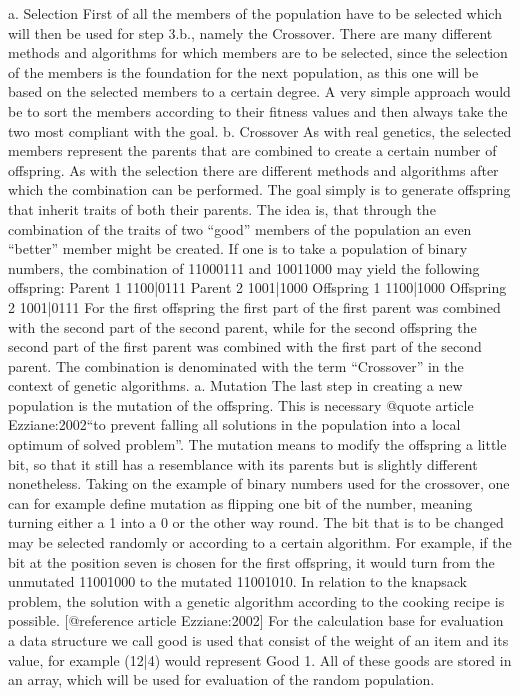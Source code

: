 \documentclass[11pt,a4paper]{article}
\begin{document}
a.    Selection
First of all the members of the population have to be selected which will then be used for step 3.b., namely the Crossover. There are many different methods and algorithms for which members are to be selected, since the selection of the members is the foundation for the next population, as this one will be based on the selected members to a certain degree.
A very simple approach would be to sort the members according to their fitness values and then always take the two most compliant with the goal.
b.    Crossover
As with real genetics, the selected members represent the parents that are combined to create a certain number of offspring. As with the selection there are different methods and algorithms after which the combination can be performed. The goal simply is to generate offspring that inherit traits of both their parents. The idea is, that through the combination of the traits of two “good” members of the population an even “better” member might be created. If one is to take a population of binary numbers, the combination of 11000111 and 10011000 may yield the following offspring: 
Parent 1    1100|0111
Parent 2    1001|1000
Offspring 1     1100|1000
Offspring 2    1001|0111
For the first offspring the first part of the first parent was combined with the second part of the second parent, while for the second offspring the second part of the first parent was combined with the first part of the second parent.
The combination is denominated with the term “Crossover” in the context of genetic algorithms.
a.       Mutation
The last step in creating a new population is the mutation of the offspring. This is necessary @quote article Ezziane:2002“to prevent falling all solutions in the population into a local optimum of solved problem”. The mutation means to modify the offspring a little bit, so that it still has a resemblance with its parents but is slightly different nonetheless.
Taking on the example of binary numbers used for the crossover, one can for example define mutation as flipping one bit of the number, meaning turning either a 1 into a 0 or the other way round. The bit that is to be changed may be selected randomly or according to a certain algorithm.
For example, if the bit at the position seven is chosen for the first offspring, it would turn from the unmutated 11001000 to the mutated 11001010.
In relation to the knapsack problem, the solution with a genetic algorithm according to the cooking recipe is possible. [@reference article Ezziane:2002]
For the calculation base for evaluation a data structure we call good is used that consist of the weight of an item and its value, for example (12|4) would represent Good 1. All of these goods are stored in an array, which will be used for evaluation of the random population.
\end{document}

